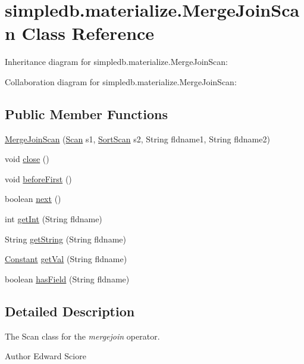 \hypertarget{classsimpledb_1_1materialize_1_1MergeJoinScan}{}\section{simpledb.\+materialize.\+Merge\+Join\+Scan Class Reference}
\label{classsimpledb_1_1materialize_1_1MergeJoinScan}


Inheritance diagram for simpledb.\+materialize.\+Merge\+Join\+Scan\+:


Collaboration diagram for simpledb.\+materialize.\+Merge\+Join\+Scan\+:
\subsection*{Public Member Functions}
\begin{DoxyCompactItemize}
\item 
\hyperlink{classsimpledb_1_1materialize_1_1MergeJoinScan_a22475a586ed556109d2dab7682a33218}{Merge\+Join\+Scan} (\hyperlink{interfacesimpledb_1_1query_1_1Scan}{Scan} s1, \hyperlink{classsimpledb_1_1materialize_1_1SortScan}{Sort\+Scan} s2, String fldname1, String fldname2)
\item 
void \hyperlink{classsimpledb_1_1materialize_1_1MergeJoinScan_a11fc3e14ebf559089454871786acf1fe}{close} ()
\item 
void \hyperlink{classsimpledb_1_1materialize_1_1MergeJoinScan_a171db3d5aad009a8f8b93dc4742f2a3a}{before\+First} ()
\item 
boolean \hyperlink{classsimpledb_1_1materialize_1_1MergeJoinScan_a557b6b51af330fe0180f639246fa7135}{next} ()
\item 
int \hyperlink{classsimpledb_1_1materialize_1_1MergeJoinScan_aa1cf26813dd8eedf72edf094d257648f}{get\+Int} (String fldname)
\item 
String \hyperlink{classsimpledb_1_1materialize_1_1MergeJoinScan_a75103d6b70f1138aa532abd01e9c436b}{get\+String} (String fldname)
\item 
\hyperlink{classsimpledb_1_1query_1_1Constant}{Constant} \hyperlink{classsimpledb_1_1materialize_1_1MergeJoinScan_a7c6aaa5825fbb2b3ca2ebd7ceb49ba5d}{get\+Val} (String fldname)
\item 
boolean \hyperlink{classsimpledb_1_1materialize_1_1MergeJoinScan_a1450a0e4f554e53c628ed66d39020fc6}{has\+Field} (String fldname)
\end{DoxyCompactItemize}


\subsection{Detailed Description}
The Scan class for the {\itshape mergejoin} operator. \begin{DoxyAuthor}{Author}
Edward Sciore 
\end{DoxyAuthor}


